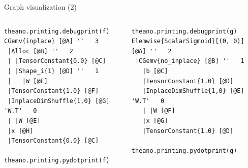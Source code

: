 \documentclass[a4paper,9pt]{beamer}
\begin{document}
\begin{frame}[fragile]{Graph visualization (2)}
  \begin{columns}
    \begin{column}{0.48\textwidth}
\footnotesize
      \begin{verbatim}
theano.printing.debugprint(f)
CGemv{inplace} [@A] ''   3
 |Alloc [@B] ''   2
 | |TensorConstant{0.0} [@C]
 | |Shape_i{1} [@D] ''   1
 |   |W [@E]
 |TensorConstant{1.0} [@F]
 |InplaceDimShuffle{1,0} [@G] 'W.T'   0
 | |W [@E]
 |x [@H]
 |TensorConstant{0.0} [@C]

theano.printing.pydotprint(f)
      \end{verbatim}
    \end{column}
    \begin{column}{0.48\textwidth}
\footnotesize
      \begin{verbatim}
theano.printing.debugprint(g)
Elemwise{ScalarSigmoid}[(0, 0)] [@A] ''   2
 |CGemv{no_inplace} [@B] ''   1
   |b [@C]
   |TensorConstant{1.0} [@D]
   |InplaceDimShuffle{1,0} [@E] 'W.T'   0
   | |W [@F]
   |x [@G]
   |TensorConstant{1.0} [@D]

theano.printing.pydotprint(g)
      \end{verbatim}
    \end{column}
  \end{columns}
\end{frame}
\end{document}
